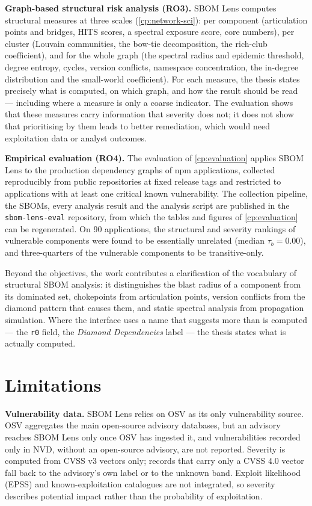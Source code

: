 \textbf{Graph-based structural risk analysis (RO3).} SBOM Lens computes structural measures at three scales (\autoref{cp:network-sci}): per component (articulation points and bridges, HITS scores, a spectral exposure score, core numbers), per cluster (Louvain communities, the bow-tie decomposition, the rich-club coefficient), and for the whole graph (the spectral radius and epidemic threshold, degree entropy, cycles, version conflicts, namespace concentration, the in-degree distribution and the small-world coefficient). For each measure, the thesis states precisely what is computed, on which graph, and how the result should be read --- including where a measure is only a coarse indicator. The evaluation shows that these measures carry information that severity does not; it does not show that prioritising by them leads to better remediation, which would need exploitation data or analyst outcomes.

\textbf{Empirical evaluation (RO4).} The evaluation of \autoref{cp:evaluation} applies SBOM Lens to the production dependency graphs of npm applications, collected reproducibly from public repositories at fixed release tags and restricted to applications with at least one critical known vulnerability. The collection pipeline, the SBOMs, every analysis result and the analysis script are published in the \texttt{sbom-lens-eval} repository, from which the tables and figures of \autoref{cp:evaluation} can be regenerated.
On 90 applications, the structural and severity rankings of vulnerable components were found to be essentially unrelated (median \(\tau_b = 0.00\)), and three-quarters of the vulnerable components to be transitive-only.

Beyond the objectives, the work contributes a clarification of the vocabulary of structural SBOM analysis: it distinguishes the blast radius of a component from its dominated set, chokepoints from articulation points, version conflicts from the diamond pattern that causes them, and static spectral analysis from propagation simulation. Where the interface uses a name that suggests more than is computed --- the \texttt{r0} field, the \emph{Diamond Dependencies} label --- the thesis states what is actually computed.


\section{Limitations}
\label{sec:concl-limitations}

\textbf{Vulnerability data.} SBOM Lens relies on OSV as its only vulnerability source. OSV aggregates the main open-source advisory databases, but an advisory reaches SBOM Lens only once OSV has ingested it, and vulnerabilities recorded only in NVD, without an open-source advisory, are not reported. Severity is computed from CVSS v3 vectors only; records that carry only a CVSS 4.0 vector fall back to the advisory's own label or to the unknown band. Exploit likelihood (EPSS) and known-exploitation catalogues are not integrated, so severity describes potential impact rather than the probability of exploitation.

